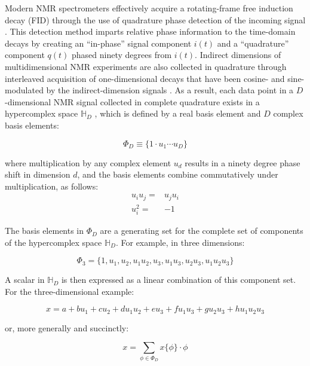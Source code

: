 \begin{doublespace}
Modern NMR spectrometers effectively acquire a rotating-frame free induction
decay (FID) through the use of quadrature phase detection of the incoming
signal \cite{levitt2008}. This detection method imparts relative phase
information to the time-domain decays by creating an ``in-phase'' signal
component $i(t)$ and a ``quadrature'' component $q(t)$ phased ninety degrees
from $i(t)$. Indirect dimensions of multidimensional NMR experiments are also
collected in quadrature through interleaved acquisition of one-dimensional
decays that have been cosine- and sine-modulated by the indirect-dimension
signals \cite{states:jmr1982}. As a result, each data point in a
$D$-dimensional NMR signal collected in complete quadrature exists in a
hypercomplex space $\mathbb{H}_D$ \cite{schuyler:jmr2013}, which is defined by
a real basis element and $D$ complex basis elements:

\begin{equation}
\Phi_D \equiv \{ 1 \cdot u_1 \cdots u_D \}
\end{equation}

where multiplication by any complex element $u_d$ results in a ninety degree
phase shift in dimension $d$, and the basis elements combine commutatively
under multiplication, as follows:
\begin{align}
u_i u_j =& u_j u_i \\
u_i^2 =& -1
\end{align}

The basis elements in $\Phi_D$ are a generating set for the complete set of
components of the hypercomplex space $\mathbb{H}_D$. For example, in three
dimensions:

\begin{equation}
\Phi_3 = \{ 1, u_1, u_2, u_1 u_2, u_3, u_1 u_3, u_2 u_3, u_1 u_2 u_3 \}
\end{equation}

A scalar in $\mathbb{H}_D$ is then expressed as a linear combination of this
component set. For the three-dimensional example:

\begin{equation}
x = a + b u_1 + c u_2 + d u_1 u_2
  + e u_3 + f u_1 u_3 + g u_2 u_3 + h u_1 u_2 u_3
\end{equation}

or, more generally and succinctly:

\begin{equation}
x = \sum_{\phi \in \Phi_D} x \{ \phi \} \cdot \phi
\end{equation}


\end{doublespace}
